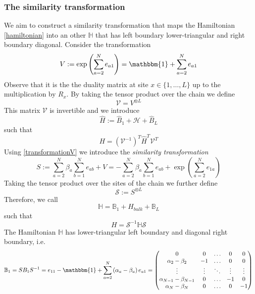 \documentclass[11pt]{article}
\numberwithin{equation}{section}
\numberwithin{equation}{subsection}
\begin{document}
\subsubsection{The similarity transformation}
We aim to construct a similarity transformation that maps the Hamiltonian \eqref{hamiltonian} into an other $\mathbb{H}$ that has left boundary lower-triangular and right boundary diagonal. Consider the transformation
\begin{equation}\label{transformationV}
 V:=\exp{\left(\sum_{a=2}^{N}e_{a1}\right)}=\mathbbm{1}+\sum_{a=2}^{N}e_{a1}
\end{equation}
Observe that it is the the duality matrix at site $x\in \{1,\ldots,L\}$ up to the multiplication by $R_{x}$. By taking the tensor product over the chain we define
\begin{equation}
    \mathcal{V}=V^{\otimes L}
\end{equation}
 This matrix $\mathcal{V}$ is invertible and we introduce 
\begin{equation}\label{hatHamiltonian}
    \widehat{H}:=\widehat{B}_{1}+\mathcal{H}+\widehat{B}_{L}
\end{equation}
such that 
\begin{equation}\label{similarV}
   H=\left(\mathcal{V}^{-1}\right)^{T}\widehat{H}^{T}\mathcal{V}^{T}
\end{equation}
Using \eqref{transformationV} we introduce the \textit{similarity transformation} 
\begin{equation}\label{similarity}
    S:=\sum_{a=2}^{N}\beta_{a}\sum_{b=1}^{N}e_{ab}+V=-\sum_{a=2}^{N}\beta_{a}\sum_{b=1}^{N}e_{ab}+\exp{\left(\sum_{a=2}^{N}e_{1a}\right)}
\end{equation}
Taking the tensor product over the sites of the chain we further define
\begin{equation}
    \mathcal{S}:=S^{\otimes L}
\end{equation}
Therefore, we call
\begin{equation}\label{bbHamiltonian}
    \mathbb{H}=\mathbb{B}_{1}+H_{bulk}+\mathbb{B}_{L}
\end{equation}
such that 
\begin{equation}\label{similarS}
    H=\mathcal{S}^{-1} \mathbb{H}\mathcal{S}
\end{equation}
The Hamiltonian $\mathbb{H}$ has lower-triangular left boundary and diagonal right boundary, i.e.
\begin{equation}
    \mathbb{B}_{1}=SB_{1}S^{-1}=e_{11}-\mathbbm{1}+\sum_{a=2}^{N}\left(\alpha_{a}-\beta_{a}\right)e_{a1}=\begin{pmatrix}
		0&0&\ldots&0&0\\
		\alpha_{2}-\beta_{2}&-1&\ldots&0&0\\
		\vdots&\vdots&\ddots&\vdots&\vdots\\
		\alpha_{N-1}-\beta_{N-1}&0&\ldots&-1&0\\
		\alpha_{N}-\beta_{N}&0&\ldots&0&-1
	\end{pmatrix}
\end{equation}
\end{document}
